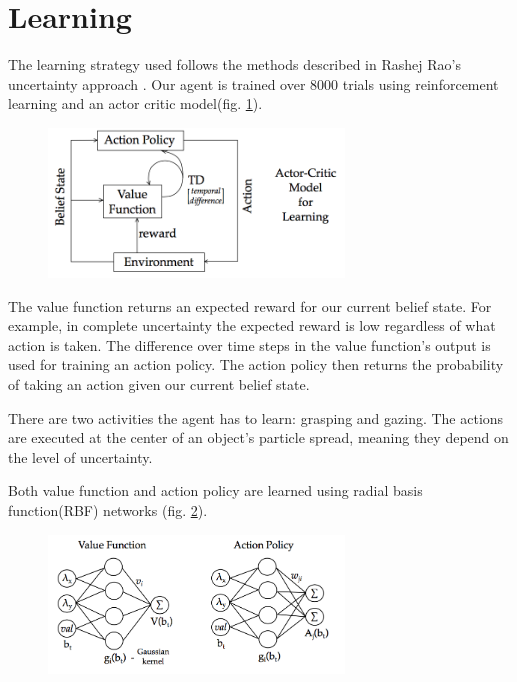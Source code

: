 \documentclass[11]{article}
\begin{document}
\section{Learning}
The learning strategy used follows the methods described in Rashej Rao's uncertainty approach \cite{rashejrao}. Our agent is trained over 8000 trials using reinforcement learning and an actor critic model(fig. \ref{fig:actor-critic}). 
\begin{figure}[h]
	\centering
	\includegraphics[width=0.7\textwidth]{actorcritic.png}
	\caption{}
	\label{fig:actor-critic}
\end{figure} 

The value function returns an expected reward for our current belief state. For example, in complete uncertainty the expected reward is low regardless of what action is taken. The difference over time steps in the value function's output is used for training an action policy. The action policy then returns the probability of taking an action given our current belief state.

There are two activities the agent has to learn: grasping and gazing. The actions are executed at the center of an object's particle spread, meaning they depend on the level of uncertainty. 

Both value function and action policy are learned using radial basis function(RBF) networks (fig. \ref{fig:rbf}).

\begin{figure}[h]
	\centering
	\includegraphics[width=0.7\textwidth]{rbf.png}
	\caption{}
	\label{fig:rbf}
\end{figure} 
\end{document}
